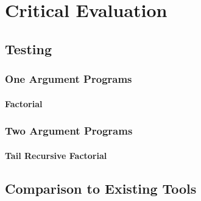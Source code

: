 \chapter{Critical Evaluation}

\section{Testing}

\subsection{One Argument Programs}

\subsubsection{Factorial}

\subsection{Two Argument Programs}

\subsubsection{Tail Recursive Factorial}

\section{Comparison to Existing Tools}
\pagebreak
%
%